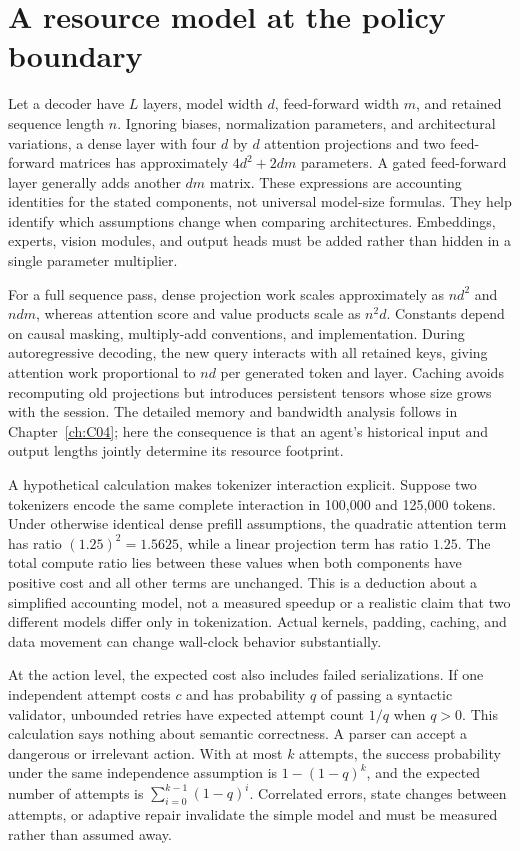 \section{A resource model at the policy boundary}
\label{sec:C03:resources}
Let a decoder have $L$ layers, model width $d$, feed-forward width $m$, and retained sequence length $n$. Ignoring biases, normalization parameters, and architectural variations, a dense layer with four $d$ by $d$ attention projections and two feed-forward matrices has approximately $4d^2+2dm$ parameters. A gated feed-forward layer generally adds another $dm$ matrix. These expressions are accounting identities for the stated components, not universal model-size formulas. They help identify which assumptions change when comparing architectures. Embeddings, experts, vision modules, and output heads must be added rather than hidden in a single parameter multiplier.

For a full sequence pass, dense projection work scales approximately as $n d^2$ and $n d m$, whereas attention score and value products scale as $n^2d$. Constants depend on causal masking, multiply-add conventions, and implementation. During autoregressive decoding, the new query interacts with all retained keys, giving attention work proportional to $nd$ per generated token and layer. Caching avoids recomputing old projections but introduces persistent tensors whose size grows with the session. The detailed memory and bandwidth analysis follows in Chapter~\ref{ch:C04}; here the consequence is that an agent's historical input and output lengths jointly determine its resource footprint.

A hypothetical calculation makes tokenizer interaction explicit. Suppose two tokenizers encode the same complete interaction in 100,000 and 125,000 tokens. Under otherwise identical dense prefill assumptions, the quadratic attention term has ratio $(1.25)^2=1.5625$, while a linear projection term has ratio $1.25$. The total compute ratio lies between these values when both components have positive cost and all other terms are unchanged. This is a deduction about a simplified accounting model, not a measured speedup or a realistic claim that two different models differ only in tokenization. Actual kernels, padding, caching, and data movement can change wall-clock behavior substantially.

At the action level, the expected cost also includes failed serializations. If one independent attempt costs $c$ and has probability $q$ of passing a syntactic validator, unbounded retries have expected attempt count $1/q$ when $q>0$. This calculation says nothing about semantic correctness. A parser can accept a dangerous or irrelevant action. With at most $k$ attempts, the success probability under the same independence assumption is $1-(1-q)^k$, and the expected number of attempts is $\sum_{i=0}^{k-1}(1-q)^i$. Correlated errors, state changes between attempts, or adaptive repair invalidate the simple model and must be measured rather than assumed away.

